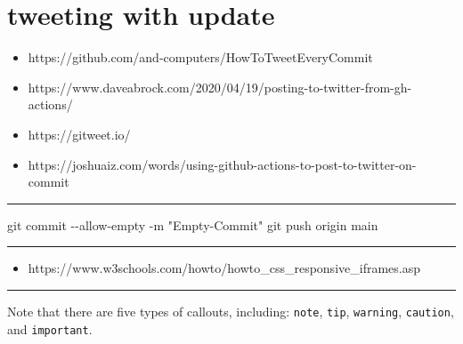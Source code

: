 \documentclass[
  letterpaper,
  DIV=11,
  numbers=noendperiod]{scrreprt}
\newenvironment{Shaded}{}{}
\newcommand{\AttributeTok}[1]{\textcolor[rgb]{0.49,0.56,0.16}{#1}}
\newcommand{\FunctionTok}[1]{\textcolor[rgb]{0.02,0.16,0.49}{#1}}
\newcommand{\NormalTok}[1]{#1}
\newcommand{\StringTok}[1]{\textcolor[rgb]{0.25,0.44,0.63}{#1}}
\providecommand{\tightlist}{%
  \setlength{\itemsep}{0pt}\setlength{\parskip}{0pt}}\usepackage{longtable,booktabs,array}
\begin{document}
\hypertarget{tweeting-with-update}{%
\section{tweeting with update}\label{tweeting-with-update}}

\begin{itemize}
\tightlist
\item
  https://github.com/and-computers/HowToTweetEveryCommit
\item
  https://www.daveabrock.com/2020/04/19/posting-to-twitter-from-gh-actions/
\item
  https://gitweet.io/
\item
  https://joshuaiz.com/words/using-github-actions-to-post-to-twitter-on-commit
\end{itemize}

\begin{center}\rule{0.5\linewidth}{0.5pt}\end{center}

\begin{Shaded}
\begin{Highlighting}[]
\FunctionTok{git}\NormalTok{ commit }\AttributeTok{{-}{-}allow{-}empty} \AttributeTok{{-}m} \StringTok{"Empty{-}Commit"}
\FunctionTok{git}\NormalTok{ push origin main}
\end{Highlighting}
\end{Shaded}

\begin{center}\rule{0.5\linewidth}{0.5pt}\end{center}

\begin{itemize}
\tightlist
\item
  https://www.w3schools.com/howto/howto\_css\_responsive\_iframes.asp
\end{itemize}

\begin{center}\rule{0.5\linewidth}{0.5pt}\end{center}

\begin{tcolorbox}[enhanced jigsaw, toptitle=1mm, arc=.35mm, titlerule=0mm, colframe=quarto-callout-note-color-frame, rightrule=.15mm, opacitybacktitle=0.6, colbacktitle=quarto-callout-note-color!10!white, toprule=.15mm, leftrule=.75mm, coltitle=black, breakable, bottomtitle=1mm, opacityback=0, title=\textcolor{quarto-callout-note-color}{\faInfo}\hspace{0.5em}{Not}, bottomrule=.15mm, left=2mm, colback=white]
Note that there are five types of callouts, including: \texttt{note},
\texttt{tip}, \texttt{warning}, \texttt{caution}, and
\texttt{important}.
\end{tcolorbox}
\end{document}
